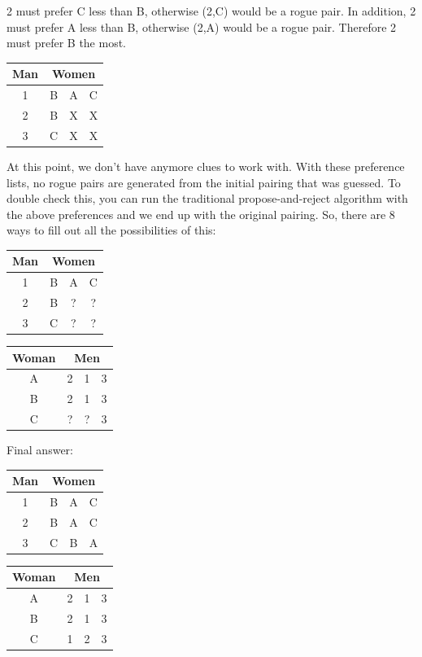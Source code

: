 \documentclass[11pt]{article}
\begin{document}
\begin{qunlist}
\begin{itemize}
2 must prefer C less than B, otherwise (2,C) would be a rogue pair. In addition, 2 must prefer A less than B, otherwise (2,A) would be a rogue pair. Therefore 2 must prefer B the most.

\begin{center}
\begin{tabular}{|c|ccc|}\hline 
Man&\multicolumn{3}{|c|}{Women}\\\hline 
1&B&A&C\\\hline 
2&B&X&X\\\hline 
3&C&X&X\\\hline
\end{tabular} 
\end{center}

At this point, we don't have anymore clues to work with. With these preference lists, no rogue pairs are generated from the initial pairing that was guessed. To double check this, you can run the traditional propose-and-reject algorithm with the above preferences and we end up with the original pairing. So, there are 8 ways to fill out all the possibilities of this:


\begin{center}
\begin{tabular}{|c|ccc|}\hline 
Man&\multicolumn{3}{|c|}{Women}\\\hline 
1&B&A&C\\\hline 
2&B&?&?\\\hline 
3&C&?&?\\\hline
\end{tabular} 
\hspace{2cm}
\begin{tabular}{|c|ccc|}\hline 
Woman&\multicolumn{3}{|c|}{Men}\\\hline 
A&2&1&3\\\hline 
B&2&1&3\\\hline 
C&?&?&3\\\hline
\end{tabular}
\end{center}


Final answer: 

\begin{center}
\begin{tabular}{|c|ccc|}\hline 
Man&\multicolumn{3}{|c|}{Women}\\\hline 
1&B&A&C\\\hline 
2&B&A&C\\\hline 
3&C&B&A\\\hline
\end{tabular} 
\hspace{2cm}
\begin{tabular}{|c|ccc|}\hline 
Woman&\multicolumn{3}{|c|}{Men}\\\hline 
A&2&1&3\\\hline 
B&2&1&3\\\hline 
C&1&2&3\\\hline
\end{tabular}
\end{center}


\end{itemize}
\end{qunlist}
\end{document}
